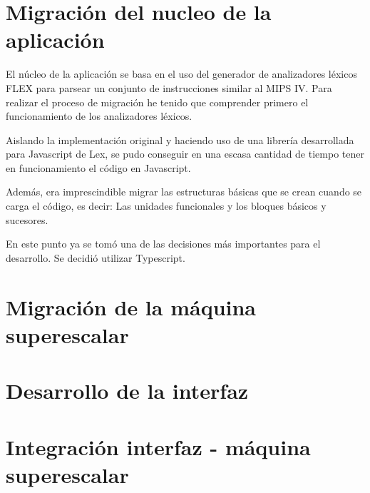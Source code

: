 

\section{Migración del nucleo de la aplicación}
\label{5:sec1} 

   El núcleo de la aplicación se basa en el uso del generador de analizadores léxicos FLEX para parsear un conjunto de instrucciones similar al MIPS IV. Para realizar el proceso de migración he tenido que comprender primero el funcionamiento de los analizadores léxicos.

   Aislando la implementación original y haciendo uso de una librería desarrollada para Javascript de Lex, se pudo conseguir en una escasa cantidad de tiempo tener en funcionamiento el código en Javascript.

   Además, era imprescindible migrar las estructuras básicas que se crean cuando se carga el código, es decir: Las unidades funcionales y los bloques básicos y sucesores.

   En este punto ya se tomó una de las decisiones más importantes para el desarrollo. Se decidió utilizar Typescript.

\section{Migración de la máquina superescalar}
\label{5:sec2} 

\section{Desarrollo de la interfaz}
\label{5:sec3} 

\section{Integración interfaz - máquina superescalar}
\label{5:sec3} 


